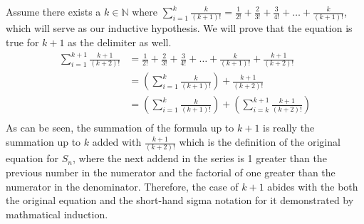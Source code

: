 \documentclass{article}
\begin{document}
\begin{enumerate}
    Assume there exists a $k \in \mathbb{N}$ where $\sum_{i=1}^k \frac{k}{(k+1)!} = \frac{1}{2!} + \frac{2}{3!} + \frac{3}{4!} + \dots + \frac{k}{(k+1)!}$, which will serve as our inductive hypothesis. We will prove that the equation is true for $k+1$ as the delimiter as well. 
    \begin{align*}
    \sum_{i=1}^{k+1} \frac{k+1}{(k+2)!} &= \frac{1}{2!} + \frac{2}{3!} + \frac{3}{4!} + \dots + \frac{k}{(k+1)!} + \frac{k+1}{(k+2)!} \\
                                        &= (\sum_{i=1}^k \frac{k}{(k+1)!}) + \frac{k+1}{(k+2)!} \\
                                        &= (\sum_{i=1}^k \frac{k}{(k+1)!}) + (\sum_{i=k}^{k+1} \frac{k+1}{(k+2)!}) \\
    \end{align*}
    As can be seen, the summation of the formula up to $k+1$ is really the summation up to $k$ added with $\frac{k+1}{(k+2)!}$ which is the definition of the original equation for $S_n$, where the next addend in the series is 1 greater than the previous number in the numerator and the factorial of one greater than the numerator in the denominator. Therefore, the case of $k+1$ abides with the both the original equation and the short-hand sigma notation for it demonstrated by mathmatical induction.
\end{enumerate}
\end{document}
